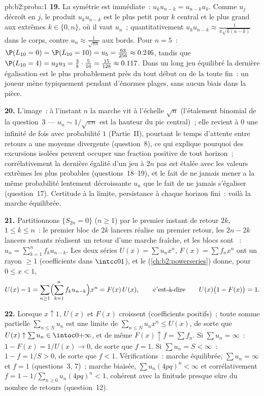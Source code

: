 \begin{solution}{pb:b2:proba:1}
\textbf{19.} La symétrie est immédiate~: $u_ku_{n-k} =
u_{n-k}u_k$. Comme $u_j$ décroît en $j$, le produit
$u_ku_{n-k}$ est le plus petit pour $k$ central et le plus grand aux
extrêmes $k \in \{0, n\}$, où il vaut $u_n$~;
quantitativement $u_ku_{n-k} \approx \frac1{\pi\sqrt{k(n-k)}}$
dans le corps, contre $u_n \approx \frac1{\sqrt{\pi n}}$ aux
bords. Pour $n = 5$~: $\P(L_{10} = 0) = \P(L_{10} = 10) =
u_5 = \frac{63}{256} \approx 0.246$, tandis que $\P(L_{10} = 4) =
u_2u_3 = \frac38\cdot\frac5{16} = \frac{15}{128} \approx
0.117$. Dans un long jeu équilibré la dernière égalisation est le plus
probablement près du tout début ou de la toute fin~: un joueur
mène typiquement pendant d'énormes plages, sans aucun biais dans la
pièce.

\textbf{20.} L'image~: à l'instant $n$ la marche vit à l'échelle
$\sqrt n$ (l'étalement binomial de la question~3 --- $u_n \sim
1/\sqrt{\pi n}$ est la hauteur du pic central)~; elle
revient à $0$ une infinité de fois avec probabilité $1$ (Partie~II),
pourtant le temps d'attente entre retours a une moyenne divergente
(question~8), ce qui explique pourquoi des excursions isolées peuvent occuper une
fraction positive de tout horizon~; corrélativement la dernière
égalité d'un jeu à $2n$ pas est étalée avec les valeurs extrêmes les
plus probables (questions~18--19), et le fait de ne jamais mener a la
même probabilité lentement décroissante $u_n$ que le fait de ne jamais s'égaliser
(question~17). Certitude à la limite, persistance à chaque
horizon fini~: voilà la marche équilibrée.

\textbf{21.} Partitionnons $\{S_{2n} = 0\}$ ($n \geq 1$) par le
premier instant de retour $2k$, $1 \leq k \leq n$~: le premier bloc de
$2k$ lancers réalise un premier retour, les $2n - 2k$
lancers restants réalisent un retour d'une marche fraîche, et les blocs sont
~: $u_n = \sum_{k=1}^nf_ku_{n-k}$. Les deux séries
$U(x) = \sum u_nx^n$, $F(x) = \sum f_nx^n$ ont un rayon $\geq
1$ (coefficients dans $\intcc01$), et le 
(\cref{ch:b2:powerseries}) donne, pour $0 \leq x < 1$,
\[
U(x) - 1 = \sum_{n\geq1}\Bigl(\sum_{k=1}^n
f_ku_{n-k}\Bigr)x^n = F(x)\,U(x),
\qquad\text{c'est-à-dire}\qquad
U(x)\bigl(1 - F(x)\bigr) = 1 .
\]

\textbf{22.} Lorsque $x \uparrow 1$, $U(x)$ et $F(x)$ croissent
(coefficients positifs)~; toute somme partielle $\sum_{n\leq
N}u_n$ est une limite de $\sum_{n\leq N}u_nx^n \leq U(x)$, de sorte que
$U(x) \uparrow \sum u_n \in \intoc0{+\infty}$, et de même
$F(x) \uparrow f = \sum f_n$. Si $\sum u_n = \infty$~: $1 -
F(x) = 1/U(x) \to 0$, de sorte que $f = 1$. Si $\sum u_n = S < \infty$~:
$1 - f = 1/S > 0$, de sorte que $f < 1$. Vérifications~: marche équilibrée, $\sum u_n =
\infty$ et $f = 1$ (questions~3, 7)~; marche biaisée, $\sum
u_n(4pq)^n < \infty$ et corrélativement $f = 1 -
1/\sum_{n\geq0}u_n(4pq)^n < 1$, cohérent avec la
finitude presque sûre du nombre de retours (question~12).


\end{solution}
